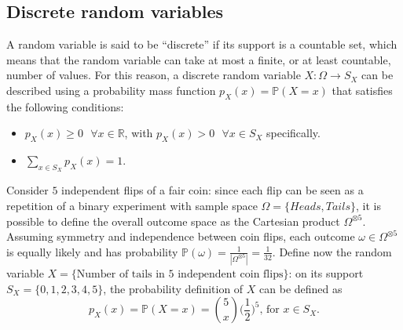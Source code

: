 \documentclass{report}
\begin{document}
\subsection{Discrete random variables}
A random variable is said to be ``discrete'' if its support is a countable set, which means that the random variable can take at most a finite, or at least countable, number of values. \newline
For this reason, a discrete random variable $\displaystyle X: \Omega \to S_X$ can be described using a probability mass function $\displaystyle p_X(x) = \mathbb{P}(X = x)$ that satisfies the following conditions:
\begin{itemize}
    \item $\displaystyle p_X(x) \ge 0 \text{ } \forall x \in \mathbb{R}$, with $\displaystyle p_X(x) > 0 \text{ } \forall x \in S_X$ specifically.
    \item $\displaystyle \sum_{x \in S_X} p_X(x) = 1$.
\end{itemize}
\begin{examplebox}
    Consider $\displaystyle 5$ independent flips of a fair coin: since each flip can be seen as a repetition of a binary experiment with sample space $\displaystyle \Omega = \{Heads, Tails\}$, it is possible to define the overall outcome space as the Cartesian product $\displaystyle \Omega^{\otimes 5}$. \newline
    Assuming symmetry and independence between coin flips, each outcome $\displaystyle \omega \in \Omega^{\otimes 5}$ is equally likely and has probability $\displaystyle \mathbb{P}(\omega) = \frac{1}{|\Omega^{\otimes 5}|} = \frac{1}{32}$. \newline
    Define now the random variable $\displaystyle X = \{\text{Number of tails in $5$ independent coin flips}\}$: on its support $\displaystyle S_X = \{0, 1, 2, 3, 4, 5\}$, the probability definition of $\displaystyle X$ can be defined as
    \[p_X(x) = \mathbb{P}(X = x) = \binom{5}{x}\bigg(\frac{1}{2}\bigg)^5 \text{, for $x \in S_X$.}\]
\end{examplebox}
\end{document}
